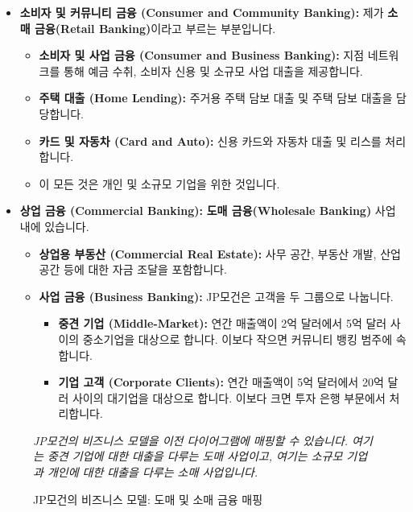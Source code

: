 \documentclass[11pt,a4paper]{article}
\theoremstyle{definition}
\begin{document}
\begin{itemize}
    \item \textbf{소비자 및 커뮤니티 금융 (Consumer and Community Banking):} 제가 \textbf{소매 금융(Retail Banking)}이라고 부르는 부분입니다.
    \begin{itemize}
        \item \textbf{소비자 및 사업 금융 (Consumer and Business Banking):} 지점 네트워크를 통해 예금 수취, 소비자 신용 및 소규모 사업 대출을 제공합니다.
        \item \textbf{주택 대출 (Home Lending):} 주거용 주택 담보 대출 및 주택 담보 대출을 담당합니다.
        \item \textbf{카드 및 자동차 (Card and Auto):} 신용 카드와 자동차 대출 및 리스를 처리합니다.
        \item 이 모든 것은 개인 및 소규모 기업을 위한 것입니다.
    \end{itemize}

    \item \textbf{상업 금융 (Commercial Banking):} \textbf{도매 금융(Wholesale Banking)} 사업 내에 있습니다.
    \begin{itemize}
        \item \textbf{상업용 부동산 (Commercial Real Estate):} 사무 공간, 부동산 개발, 산업 공간 등에 대한 자금 조달을 포함합니다.
        \item \textbf{사업 금융 (Business Banking):} JP모건은 고객을 두 그룹으로 나눕니다.
        \begin{itemize}
            \item \textbf{중견 기업 (Middle-Market):} 연간 매출액이 2억 달러에서 5억 달러 사이의 중소기업을 대상으로 합니다. 이보다 작으면 커뮤니티 뱅킹 범주에 속합니다.
            \item \textbf{기업 고객 (Corporate Clients):} 연간 매출액이 5억 달러에서 20억 달러 사이의 대기업을 대상으로 합니다. 이보다 크면 투자 은행 부문에서 처리합니다.
        \end{itemize}
    \end{itemize}
\end{itemize}

\begin{figure}[h!]
    \centering
    \caption{JP모건의 비즈니스 모델: 도매 및 소매 금융 매핑}
    \label{fig:jpmorgan_diagram}
    \textit{JP모건의 비즈니스 모델을 이전 다이어그램에 매핑할 수 있습니다. 여기는 중견 기업에 대한 대출을 다루는 도매 사업이고, 여기는 소규모 기업과 개인에 대한 대출을 다루는 소매 사업입니다.}
\end{figure}
\end{document}
